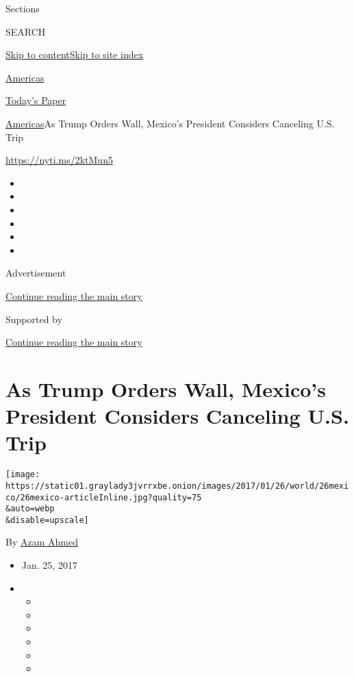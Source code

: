 Sections

SEARCH

\protect\hyperlink{site-content}{Skip to
content}\protect\hyperlink{site-index}{Skip to site index}

\href{https://www.nytimes3xbfgragh.onion/section/world/americas}{Americas}

\href{https://myaccount.nytimes3xbfgragh.onion/auth/login?response_type=cookie\&client_id=vi}{}

\href{https://www.nytimes3xbfgragh.onion/section/todayspaper}{Today's
Paper}

\href{/section/world/americas}{Americas}\textbar{}As Trump Orders Wall,
Mexico's President Considers Canceling U.S. Trip

\url{https://nyti.ms/2ktMun5}

\begin{itemize}
\item
\item
\item
\item
\item
\item
\end{itemize}

Advertisement

\protect\hyperlink{after-top}{Continue reading the main story}

Supported by

\protect\hyperlink{after-sponsor}{Continue reading the main story}

\hypertarget{as-trump-orders-wall-mexicos-president-considers-canceling-us-trip}{%
\section{As Trump Orders Wall, Mexico's President Considers Canceling
U.S.
Trip}\label{as-trump-orders-wall-mexicos-president-considers-canceling-us-trip}}

\texttt{[image: https://static01.graylady3jvrrxbe.onion/images/2017/01/26/world/26mexico/26mexico-articleInline.jpg?quality=75\\\&auto=webp\\\&disable=upscale]}

By \href{http://www.nytimes3xbfgragh.onion/by/azam-ahmed}{Azam Ahmed}

\begin{itemize}
\item
  Jan. 25, 2017
\item
  \begin{itemize}
  \item
  \item
  \item
  \item
  \item
  \item
  \end{itemize}
\end{itemize}

